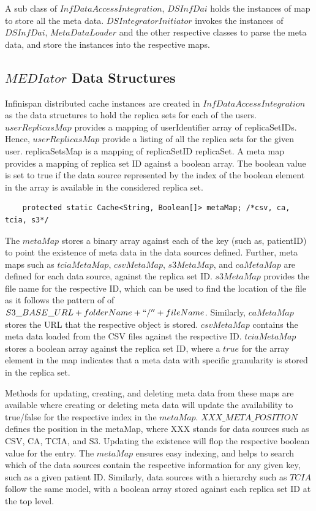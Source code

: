 \documentclass[conference]{IEEEtran}
\begin{document}
A sub class of $InfDataAccessIntegration$, $DSInfDai$ holds the instances of map to store all the meta data. $DSIntegratorInitiator$ invokes the instances of $DSInfDai$, $MetaDataLoader$ and the other respective classes to parse the meta data, and store the instances into the respective maps. 

\subsection{$MEDIator$ Data Structures}
Infinispan distributed cache instances are created in $InfDataAccessIntegration$ as the data structures to hold the replica sets for each of the users. $userReplicasMap$ provides a mapping of userIdentifier  array of replicaSetIDs. Hence, $userReplicasMap$ provide a listing of all the replica sets for the given user. replicaSetsMap is a mapping of replicaSetID  replicaSet. A meta map provides a  mapping of replica set ID against a boolean array. The boolean value is set to true if the data source represented by the index of the boolean element in the array is available in the considered replica set.

 \vspace{-10pt}
\begin{lstlisting}  
    protected static Cache<String, Boolean[]> metaMap; /*csv, ca, tcia, s3*/
\end{lstlisting} 
 \vspace{-15pt}

The $metaMap$ stores a binary array against each of the key (such as, patientID) to point the existence of meta data in the data sources defined. Further, meta maps such as $tciaMetaMap$, $csvMetaMap$, $s3MetaMap$, and $caMetaMap$ are defined for each data source, against the replica set ID. $s3MetaMap$ provides the file name for the respective ID, which can be used to find the location of the file as it follows the pattern of of $S3\_BASE\_URL + folderName + ``/'' + fileName$. Similarly, $caMetaMap$ stores the URL that the respective object is stored. $csvMetaMap$ contains the meta data loaded from the CSV files against the respective ID. $tciaMetaMap$ stores a boolean array against the replica set ID, where a $true$ for the array element in the map indicates that a meta data with specific granularity is stored in the replica set.

Methods for updating, creating, and deleting meta data from these maps are available where creating or deleting meta data will update the availability to true/false for the respective index in the $metaMap$. $XXX\_META\_POSITION$ defines the position in the metaMap, where XXX stands for data sources such as CSV, CA, TCIA, and S3. Updating the existence will flop the respective boolean value for the entry. The $metaMap$ ensures easy indexing, and helps to search which of the data sources contain the respective information for any given key, such as a given patient ID. Similarly, data sources with a hierarchy such as $TCIA$ follow the same model, with a boolean array stored against each replica set ID at the top level.
\end{document}

